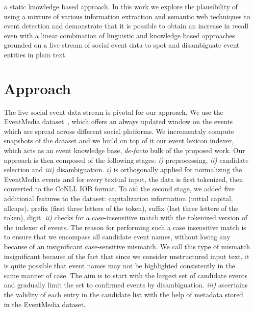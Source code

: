 \documentclass[10pt,a4paper]{article}
\begin{document}
{\color{red}{G: which static doesn't fit this context?}} a static knowledge based approach. \newline
In this work we explore the plausibility of using a mixture of various information extraction and semantic web techniques to event detection and demonstrate that it is possible to obtain an increase in recall even with a linear combination of linguistic and knowledge based approaches grounded on a live stream of social event data to spot and disambiguate event entities in plain text.

\section{Approach}
The live social event data stream is pivotal for our approach. We use the EventMedia dataset~\cite{krouf2012}, which offers an always updated window on the events which are spread across different social platforms. We incrementaly compute snapshots of the dataset and we build on top of it our event lexicon indexer, which acts as an event knowledge base, \textit{de-facto} bulk of the proposed work. Our approach is then composed of the following stages: \textit{i)} preprocessing, \textit{ii)} candidate selection and \textit{iii)} disambiguation. \textit{i)} is orthogonally applied for normalizing the EventMedia events and for every textual input, the data is first tokenized, then converted to the CoNLL IOB format. To aid the second stage, we added five additional features to the dataset: capitalization information (initial capital, allcaps), prefix (first three letters of the token), suffix (last three letters of the token), digit.
\textit{ii)} checks for a case-insensitive match with the tokenized version of the indexer of events. The reason for performing such a case insensitive match is to ensure that we encompass all candidate event names, without losing any because of an insignificant case-sensitive mismatch. We call this type of mismatch insignificant because of the fact that since we consider unstructured input text, it is quite possible that event names may not be highlighted consistently in the same manner of case. The aim is to start with the largest set of candidate events and gradually limit the set to confirmed events by disambiguation. 
\textit{iii)} ascertains the validity of each entry in the candidate list with the help of metadata stored in the EventMedia dataset. 
\end{document}
